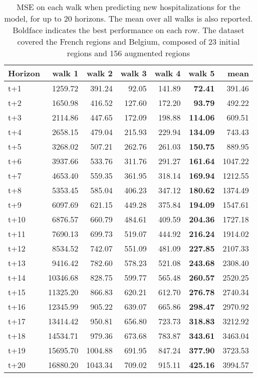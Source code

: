 \begin{table}[H]
\centering
\caption{MSE on each walk when predicting new hospitalizations for the model, for up to 20 horizons. The mean over all walks is also reported. Boldface indicates the best performance on each row. The dataset covered the French regions and Belgium, composed of 23 initial regions and 156 augmented regions }
\label{tab:MSE_walk_custom_linear_regression}
\begin{tabular}{lrrrrrr}
\toprule
Horizon &   walk 1 &  walk 2 &  walk 3 &  walk 4 &  walk 5 &    mean \\
\midrule
t+1  & 1259.72  & 391.24  & 92.05  & 141.89  & \textbf{72.41}  & 391.46  \\
t+2  & 1650.98  & 416.52  & 127.60  & 172.20  & \textbf{93.79}  & 492.22  \\
t+3  & 2114.86  & 447.65  & 172.09  & 198.88  & \textbf{114.06}  & 609.51  \\
t+4  & 2658.15  & 479.04  & 215.93  & 229.94  & \textbf{134.09}  & 743.43  \\
t+5  & 3268.02  & 507.21  & 262.76  & 261.03  & \textbf{150.75}  & 889.95  \\
t+6  & 3937.66  & 533.76  & 311.76  & 291.27  & \textbf{161.64}  & 1047.22  \\
t+7  & 4653.40  & 559.35  & 361.95  & 318.14  & \textbf{169.94}  & 1212.55  \\
t+8  & 5353.45  & 585.04  & 406.23  & 347.12  & \textbf{180.62}  & 1374.49  \\
t+9  & 6097.69  & 621.15  & 449.28  & 375.84  & \textbf{194.09}  & 1547.61  \\
t+10  & 6876.57  & 660.79  & 484.61  & 409.59  & \textbf{204.36}  & 1727.18  \\
t+11  & 7690.13  & 699.73  & 519.07  & 444.92  & \textbf{216.24}  & 1914.02  \\
t+12  & 8534.52  & 742.07  & 551.09  & 481.09  & \textbf{227.85}  & 2107.33  \\
t+13  & 9416.42  & 782.60  & 578.23  & 521.08  & \textbf{243.68}  & 2308.40  \\
t+14  & 10346.68  & 828.75  & 599.77  & 565.48  & \textbf{260.57}  & 2520.25  \\
t+15  & 11325.20  & 866.83  & 620.21  & 612.70  & \textbf{276.78}  & 2740.34  \\
t+16  & 12345.99  & 905.22  & 639.07  & 665.86  & \textbf{298.47}  & 2970.92  \\
t+17  & 13414.42  & 950.81  & 656.80  & 723.73  & \textbf{318.83}  & 3212.92  \\
t+18  & 14534.71  & 979.36  & 673.68  & 783.87  & \textbf{343.61}  & 3463.04  \\
t+19  & 15695.70  & 1004.88  & 691.95  & 847.24  & \textbf{377.90}  & 3723.53  \\
t+20  & 16880.20  & 1043.34  & 709.02  & 915.11  & \textbf{425.16}  & 3994.57  \\

\bottomrule
\end{tabular}
\end{table}
